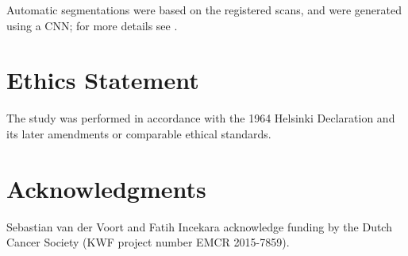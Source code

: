 Automatic segmentations were based on the registered scans, and were generated using a \gls{CNN}; for more details see .

\section*{Ethics Statement}
The study was performed in accordance with the 1964 Helsinki Declaration and its later amendments or comparable ethical standards.


\section*{Acknowledgments}
Sebastian van der Voort and Fatih Incekara acknowledge funding by the Dutch Cancer Society (KWF project number EMCR 2015-7859).

